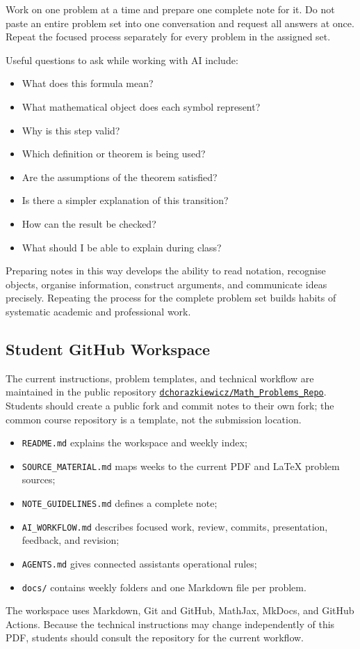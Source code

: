 Work on one problem at a time and prepare one complete note for it. Do not paste
an entire problem set into one conversation and request all answers at once.
Repeat the focused process separately for every problem in the assigned set.

Useful questions to ask while working with AI include:
\begin{itemize}
    \item What does this formula mean?
    \item What mathematical object does each symbol represent?
    \item Why is this step valid?
    \item Which definition or theorem is being used?
    \item Are the assumptions of the theorem satisfied?
    \item Is there a simpler explanation of this transition?
    \item How can the result be checked?
    \item What should I be able to explain during class?
\end{itemize}

Preparing notes in this way develops the ability to read notation, recognise
objects, organise information, construct arguments, and communicate ideas
precisely. Repeating the process for the complete problem set builds habits of
systematic academic and professional work.

\subsection*{Student GitHub Workspace}

The current instructions, problem templates, and technical workflow are
maintained in the public repository
\href{https://github.com/dchorazkiewicz/Math_Problems_Repo}
{\texttt{dchorazkiewicz/Math\_Problems\_Repo}}. Students should create a public
fork and commit notes to their own fork; the common course repository is a
template, not the submission location.

\begin{itemize}
    \item \texttt{README.md} explains the workspace and weekly index;
    \item \texttt{SOURCE\_MATERIAL.md} maps weeks to the current PDF and LaTeX
          problem sources;
    \item \texttt{NOTE\_GUIDELINES.md} defines a complete note;
    \item \texttt{AI\_WORKFLOW.md} describes focused work, review, commits,
          presentation, feedback, and revision;
    \item \texttt{AGENTS.md} gives connected assistants operational rules;
    \item \texttt{docs/} contains weekly folders and one Markdown file per
          problem.
\end{itemize}
The workspace uses Markdown, Git and GitHub, MathJax, MkDocs, and GitHub Actions.
Because the technical instructions may change independently of this PDF,
students should consult the repository for the current workflow.
